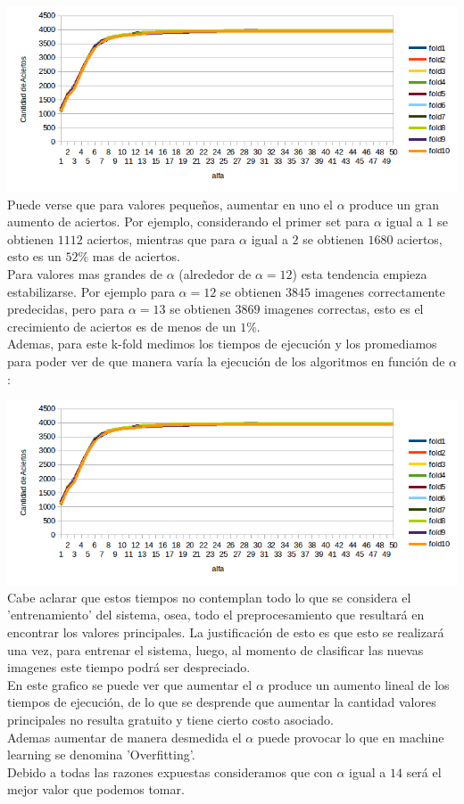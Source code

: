 \includegraphics[scale=0.75]{nuevosResultados/pca/pca1.png}\\
Puede verse que para valores pequeños, aumentar en uno el $\alpha$ produce un gran aumento de aciertos. Por ejemplo, considerando el primer set para $\alpha$ igual a $1$ se obtienen $1112$ aciertos, mientras que para $\alpha$ igual a $2$ se obtienen $1680$ aciertos, esto es un $52\%$ mas de aciertos.
\\
Para valores mas grandes de $\alpha$ (alrededor de $\alpha = 12$) esta tendencia empieza estabilizarse. Por ejemplo para $\alpha = 12$ se obtienen $3845$ imagenes correctamente predecidas, pero para $\alpha = 13$ se obtienen $3869$ imagenes correctas, esto es el crecimiento de aciertos es de menos de un $1\%$.
\\
Ademas, para este k-fold medimos los tiempos de ejecución y los promediamos para poder ver de que manera varía la ejecución de los algoritmos en función de $\alpha$:

\includegraphics[scale=0.75]{nuevosResultados/pca/pca1.png}\\

Cabe aclarar que estos tiempos no contemplan todo lo que se considera el 'entrenamiento' del sistema, osea, todo el preprocesamiento que resultará en encontrar los valores principales. La justificación de esto es que esto se realizará una vez, para entrenar el sistema, luego, al momento de clasificar las nuevas imagenes este tiempo podrá ser despreciado.
\\
En este grafico se puede ver que aumentar el $\alpha$ produce un aumento lineal de los tiempos de ejecución, de lo que se desprende que aumentar la cantidad valores principales no resulta gratuito y tiene cierto costo asociado.
\\
Ademas aumentar de manera desmedida el $\alpha$ puede provocar lo que en machine learning se denomina 'Overfitting'.
\inventarReferencia
\\
Debido a todas las razones expuestas consideramos que con $\alpha$ igual a $14$ será el mejor valor que podemos tomar.
\\
